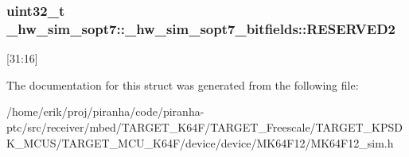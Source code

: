 \subsubsection[{\texorpdfstring{R\+E\+S\+E\+R\+V\+E\+D2}{RESERVED2}}]{\setlength{\rightskip}{0pt plus 5cm}uint32\+\_\+t \+\_\+hw\+\_\+sim\+\_\+sopt7\+::\+\_\+hw\+\_\+sim\+\_\+sopt7\+\_\+bitfields\+::\+R\+E\+S\+E\+R\+V\+E\+D2}\hypertarget{struct__hw__sim__sopt7_1_1__hw__sim__sopt7__bitfields_ad86c8a285e23a3c2a7bca0f07c1af6f9}{}\label{struct__hw__sim__sopt7_1_1__hw__sim__sopt7__bitfields_ad86c8a285e23a3c2a7bca0f07c1af6f9}
\mbox{[}31\+:16\mbox{]} 

The documentation for this struct was generated from the following file\+:\begin{DoxyCompactItemize}
\item 
/home/erik/proj/piranha/code/piranha-\/ptc/src/receiver/mbed/\+T\+A\+R\+G\+E\+T\+\_\+\+K64\+F/\+T\+A\+R\+G\+E\+T\+\_\+\+Freescale/\+T\+A\+R\+G\+E\+T\+\_\+\+K\+P\+S\+D\+K\+\_\+\+M\+C\+U\+S/\+T\+A\+R\+G\+E\+T\+\_\+\+M\+C\+U\+\_\+\+K64\+F/device/device/\+M\+K64\+F12/M\+K64\+F12\+\_\+sim.\+h\end{DoxyCompactItemize}
